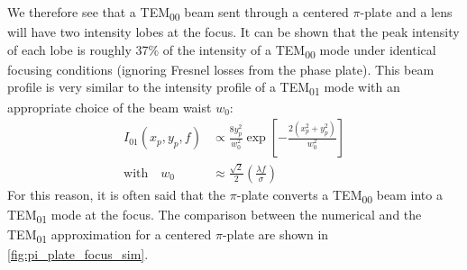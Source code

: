 We therefore see that a TEM\textsubscript{00} beam sent through a centered $\pi$-plate and a lens will have two intensity lobes at the focus. It can be shown that the peak intensity of each lobe is roughly 37\% of the intensity of a TEM\textsubscript{00} mode under identical focusing conditions (ignoring Fresnel losses from the phase plate).
This beam profile is very similar to the intensity profile of a TEM\textsubscript{01} mode with an appropriate choice of the beam waist $w_0$:
\begin{align}
I_{01}(x_p,y_p,f) &\propto \frac{8 y_p^2}{w_0^2} \exp\left[- \frac{2(x_p^2+y_p^2)}{w_0^2}\right] \label{eqn:TEM01_mode} \\
\textrm{with} \quad w_0 &\approx \frac{\sqrt{2}}{2} \left( \frac{ \lambda f}{\sigma} \right) \nonumber
\end{align}
For this reason, it is often said that the $\pi$-plate converts a TEM\textsubscript{00} beam into a TEM\textsubscript{01} mode at the focus. The comparison between the numerical and the TEM\textsubscript{01} approximation for a centered $\pi$-plate are shown in \cref{fig:pi_plate_focus_sim}.
